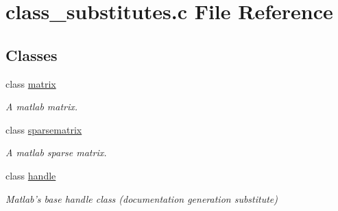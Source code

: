 \hypertarget{a00016}{\section{class\-\_\-substitutes.\-c File Reference}
\label{a00016}
}
\subsection*{Classes}
\begin{DoxyCompactItemize}
\item 
class \hyperlink{a00010}{matrix}
\begin{DoxyCompactList}\small\item\em A matlab matrix. \end{DoxyCompactList}\item 
class \hyperlink{a00012}{sparsematrix}
\begin{DoxyCompactList}\small\item\em A matlab sparse matrix. \end{DoxyCompactList}\item 
class \hyperlink{a00007}{handle}
\begin{DoxyCompactList}\small\item\em Matlab's base handle class (documentation generation substitute) \end{DoxyCompactList}\end{DoxyCompactItemize}
